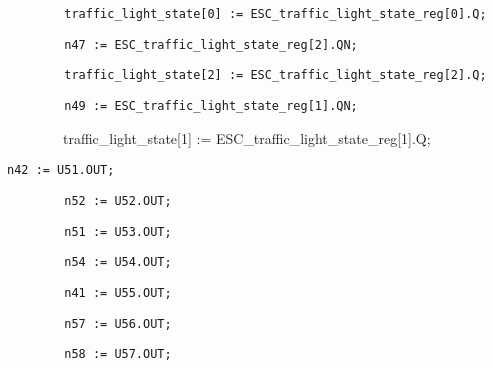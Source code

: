 \documentclass[a4paper]{article}
\begin{document}
\begin{center}
\begin{minipage}{6.04583in}
{\color[rgb]{0.0,0.0,0.039215688}
\texttt{\ \ \ \ \ \ \ \ traffic\_light\_state[0] :=
ESC\_traffic\_light\_state\_reg[0].Q;}}

{\color[rgb]{0.0,0.0,0.039215688}
\texttt{\ \ \ \ \ \ \ \ n47 := ESC\_traffic\_light\_state\_reg[2].QN;}}

{\color[rgb]{0.0,0.0,0.039215688}
\texttt{\ \ \ \ \ \ \ \ traffic\_light\_state[2] :=
ESC\_traffic\_light\_state\_reg[2].Q;}}

{\color[rgb]{0.0,0.0,0.039215688}
\texttt{\ \ \ \ \ \ \ \ n49 := ESC\_traffic\_light\_state\_reg[1].QN;}}

{\ttfamily\color[rgb]{0.0,0.0,0.039215688}
\ \ \ \ \ \ \ \ traffic\_light\_state[1] :=
ESC\_traffic\_light\_state\_reg[1].Q;\ }

{\color[rgb]{0.0,0.0,0.039215688}
\texttt{n42 := U51.OUT;}}

{\color[rgb]{0.0,0.0,0.039215688}
\texttt{\ \ \ \ \ \ \ \ n52 := U52.OUT;}}

{\color[rgb]{0.0,0.0,0.039215688}
\texttt{\ \ \ \ \ \ \ \ n51 := U53.OUT;}}

{\color[rgb]{0.0,0.0,0.039215688}
\texttt{\ \ \ \ \ \ \ \ n54 := U54.OUT;}}

{\color[rgb]{0.0,0.0,0.039215688}
\texttt{\ \ \ \ \ \ \ \ n41 := U55.OUT;}}

{\color[rgb]{0.0,0.0,0.039215688}
\texttt{\ \ \ \ \ \ \ \ n57 := U56.OUT;}}

{\color[rgb]{0.0,0.0,0.039215688}
\texttt{\ \ \ \ \ \ \ \ n58 := U57.OUT;}}


\bigskip


\bigskip


\bigskip
\end{minipage}
\end{center}

\bigskip


\bigskip


\bigskip


\bigskip


\bigskip


\bigskip


\bigskip


\bigskip


\bigskip


\bigskip


\bigskip


\bigskip


\bigskip


\bigskip


\bigskip
\end{document}

